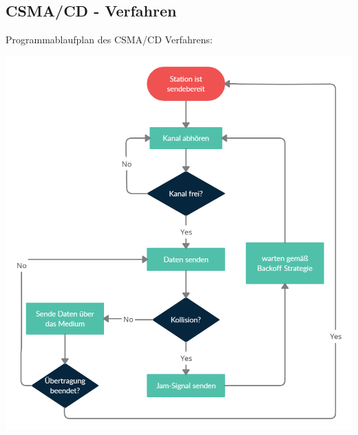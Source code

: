 \documentclass[12pt,a4paper]{article}
\begin{document}
		\subsection{CSMA/CD - Verfahren}
			Programmablaufplan des CSMA/CD Verfahrens:
			\begin{center}
				\includegraphics[scale=0.3]{Bilder/CSMACD.png}
			\end{center}
		
\end{document}
